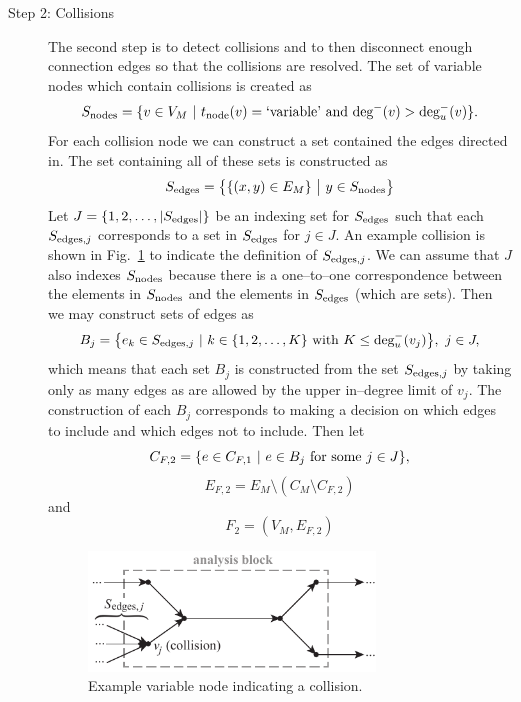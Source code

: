 \begin{description}
	\item[Step 2: Collisions] 
		The second step is to detect collisions and to then disconnect enough connection edges so that the collisions are resolved. 
		The set of variable nodes which contain collisions is created as
	\begin{equation}
	S_\textrm{nodes} = \{v \in V_M \ | \  t_\textrm{node}(v) = \textrm{`variable'} \textrm{ and } \textrm{deg}^-(v) > \textrm{deg}_u^-(v) \}.
	\end{equation}
	For each collision node we can construct a set contained the edges directed in. The set containing all of these sets is constructed as
	\begin{equation}
		S_\textrm{edges} = \big \{ \{(x,y) \in E_M\} \ \big| \ y \in S_\textrm{nodes} \big \}
	\end{equation}
	Let $J=\{1,2,\ldots,|S_\textrm{edges}|\}$ be an indexing set for $S_\textrm{edges}$ such that each $S_{\textrm{edges},j}$ corresponds to a set in $S_\textrm{edges}$ for $j \in J$. 
	An example collision is shown in Fig.~\ref{f:collision} to indicate the definition of $S_{\textrm{edges},j}$. 
	We can assume that $J$ also indexes $S_\textrm{nodes}$ because there is a one--to--one correspondence between the elements in $S_\textrm{nodes}$ and the elements in $S_\textrm{edges}$ (which are sets). 
	Then we may construct sets of edges as
	\begin{equation}
	B_j = \big \{e_k \in S_{\textrm{edges},j} \ | \  k \in \{1,2,\ldots,K\} \textrm{ with } K \leq \textrm{deg}_u^-(v_j) \big \}, \ j \in J,
	\end{equation}
		which means that each set $B_j$ is constructed from the set $S_{\textrm{edges},j}$ by taking only as many edges as are allowed by the upper in--degree limit of $v_j$. 
		The construction of each $B_j$ corresponds to making a decision on which edges to include and which edges not to include. Then let
	\begin{equation}
	C_{F,2} = \{ e \in C_{F,1} \ | \  e \in B_j \textrm{ for some } j \in J\},
	\end{equation}
	\begin{equation}
	E_{F,2} = E_M \setminus (C_M \setminus C_{F,2})
	\end{equation}
	and
	\begin{equation}
	F_2 = (V_M,E_{F,2})
	\end{equation}
	\begin{figure}[htb!]
		\begin{center}
		\includegraphics[width=3in]{images/analysis_block_collision}
		\end{center}
		\vspace{-20pt}
	\caption{Example variable node indicating a collision.}
	\label{f:collision}
	\end{figure}


\end{description}
